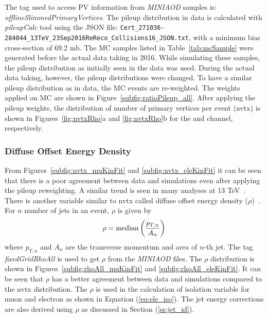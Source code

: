 The tag used to access PV information from {\em MINIAOD} samples is: {\em offlineSlimmedPrimaryVertices}.
The pileup distribution in data is calculated with {\em pileupCalc} tool using the JSON file:
\verb|Cert_271036-284044_13TeV_23Sep2016ReReco_Collisions16_JSON.txt|, with a minimum bias cross-section of 69.2 mb. 
The MC samples listed in Table~\ref{tab:mcSample} were generated before the actual data taking in 2016.
While simulating these samples, the pileup distribution as initially seen in the data was used. 
During the actual data taking, however, the pileup distributions were changed.
To have a similar pileup distribution as in data, the MC events are re-weighted.
The weights applied on MC are shown in Figure~\ref{subfig:ratioPileup_all}.
After applying the pileup weights, the distribution of number of primary vertices per event (nvtx) is shown in
Figures~\ref{fig:nvtxRho}a and \ref{fig:nvtxRho}b for the \mujets and \ejets channel, respectively.

\subsubsection{Diffuse Offset Energy Density}
From Figures~\ref{subfig:nvtx_muKinFit} and \ref{subfig:nvtx_eleKinFit} it can be seen that there is a poor
agreement between data and simulations even after applying the pileup reweighting.
A similar trend is seen in many analyses at 13 TeV~\cite{CMS-AN-17-003, CMS-AN-17-116}. There is 
another variable similar to nvtx called diffuse offset energy density ($\rho$)~\cite{Cacciari:2005hq, Cacciari:2011ma}.
For $n$ number of jets in an event, $\rho$ is given by~\cite{Cacciari:2007fd}
\begin{equation}
    \rho = {\rm median}\left(\frac{p_{T, n}}{A_n}\right)
    \label{eq:rho}
\end{equation}
where $p_{T,n}$ and $A_n$ are the transverse momentum and area of $n$-th jet.
The tag {\em fixedGridRhoAll} is used to get $\rho$ from the {\em MINIAOD} files.
The $\rho$ distribution is shown in Figures~\ref{subfig:rhoAll_muKinFit} and \ref{subfig:rhoAll_eleKinFit}. 
It can be seen that $\rho$ has a better agreement between data and simulations compared to the nvtx
distribution. The $\rho$ is used in the calculation of isolation variable for muon and 
electron as shown in Equation (\ref{eq:ele_iso}). The jet energy corrections are also 
derived using $\rho$ as discussed in Section (\ref{ss:jet_id}).

